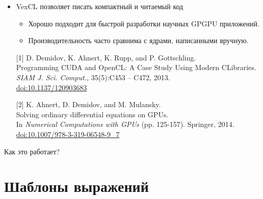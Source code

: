\documentclass[@BEAMER_OPTIONS@]{beamer}
\newcommand{\CXX}{{\rm C}\plusplus}
\begin{document}
\begin{frame}[fragile]{}
    \begin{itemize}
        \item VexCL позволяет писать компактный и читаемый код
            \begin{itemize}
                \item Хорошо подходит для быстрой разработки научных GPGPU
                    приложений.
                \item Производительность часто сравнима с ядрами, написанными
                    вручную.
            \end{itemize}
    \end{itemize}
    \vspace{\baselineskip}
    \begin{itemize}
        \item[{[1]}] D. Demidov, K. Ahnert, K. Rupp, and P. Gottschling.\\
            Programming CUDA and OpenCL: A Case Study Using Modern \CXX Libraries.\\
            \emph{SIAM J. Sci. Comput.,} 35(5):C453 – C472, 2013.\\
            \href{http://dx.doi.org/10.1137/120903683}{doi:10.1137/120903683}
        \item[{[2]}] K. Ahnert, D. Demidov, and M. Mulansky.\\
            Solving ordinary differential equations on GPUs.\\
            In \emph{Numerical Computations with GPUs} (pp. 125-157).  Springer, 2014.
            \href{http://dx.doi.org/10.1007/978-3-319-06548-9\_7}{doi:10.1007/978-3-319-06548-9\_7}
    \end{itemize}
\end{frame}

\note{ }

\begin{frame}
    \begin{center}
        \huge{Как это работает?}
    \end{center}
\end{frame}

\note{ }

\section{Шаблоны выражений}
\begin{frame}
    \sectionpage
\end{frame}
\end{document}
